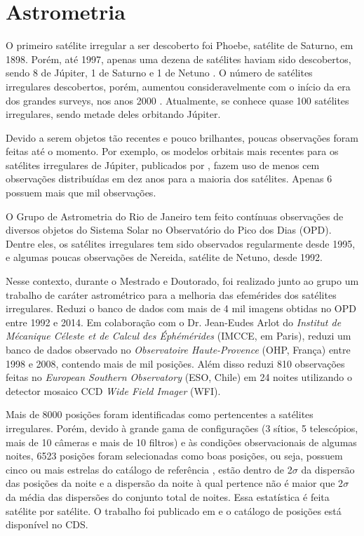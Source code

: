 \documentclass[12pt,a4paper]{report}
\begin{document}
\section{Astrometria} \label{Sec:astrometria}

\indent \indent O primeiro satélite irregular a ser descoberto foi Phoebe, satélite de Saturno, em 1898. Porém, até 1997, apenas uma dezena de satélites haviam sido descobertos, sendo 8 de Júpiter, 1 de Saturno e 1 de Netuno \citep{Sheppard2005}. O número de satélites irregulares descobertos, porém, aumentou consideravelmente com o início da era dos grandes surveys, nos anos 2000 \citep{Sheppard2003}. Atualmente, se conhece quase 100 satélites irregulares, sendo metade deles orbitando Júpiter.

Devido a serem objetos tão recentes e pouco brilhantes, poucas observações foram feitas até o momento. Por exemplo, os modelos orbitais mais recentes para os satélites irregulares de Júpiter, publicados por \cite{Brozovic2017}, fazem uso de menos cem observações distribuídas em dez anos para a maioria dos satélites. Apenas 6 possuem mais que mil observações.

O Grupo de Astrometria do Rio de Janeiro tem feito contínuas observações de diversos objetos do Sistema Solar no Observatório do Pico dos Dias (OPD). Dentre eles, os satélites irregulares tem sido observados regularmente desde 1995, e algumas poucas observações de Nereida, satélite de Netuno, desde 1992.

Nesse contexto, durante o Mestrado e Doutorado, foi realizado junto ao grupo um trabalho de caráter astrométrico para a melhoria das efemérides dos satélites irregulares. Reduzi o banco de dados com mais de 4 mil imagens obtidas no OPD entre 1992 e 2014. Em colaboração com o Dr. Jean-Eudes Arlot do \textit{Institut de Mécanique Céleste et de Calcul des Éphémérides} (IMCCE, em Paris), reduzi um banco de dados observado no \textit{Observatoire Haute-Provence} (OHP, França) entre 1998 e 2008, contendo mais de mil posições. Além disso reduzi 810 observações feitas no \textit{European Southern Observatory} (ESO, Chile) em 24 noites utilizando o detector mosaico CCD \textit{Wide Field Imager} (WFI).

Mais de 8000 posições foram identificadas como pertencentes a satélites irregulares. Porém, devido à grande gama de configurações (3 sítios, 5 telescópios, mais de 10 câmeras e mais de 10 filtros) e às condições observacionais de algumas noites, 6523 posições foram selecionadas como boas posições, ou seja, possuem cinco ou mais estrelas do catálogo de referência \citep[UCAC4, ][]{Zacharias2013}, estão dentro de 2$\sigma$ da dispersão das posições da noite e a dispersão da noite à qual pertence não é maior que 2$\sigma$ da média das dispersões do conjunto total de noites. Essa estatística é feita satélite por satélite. O trabalho foi publicado em \cite{GomesJunior2015-Irregular} e o catálogo de posições está disponível no CDS.
\end{document}
